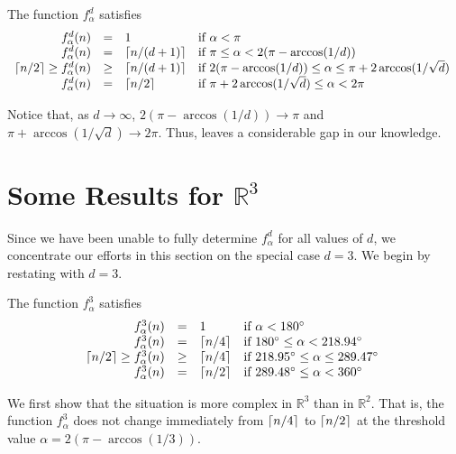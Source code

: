\documentclass[lotsofwhite]{patmorin}
\newcommand{\R}{\mathbb{R}}
\begin{document}
\begin{thm}
The function $f_\alpha^d$ satisfies
\[\begin{array}{rcll}
  f^d_\alpha(n) & = & 1 & \mbox{if $\alpha < \pi$} \\
  f^d_\alpha(n) & = & \left\lceil n/(d+1) \right\rceil & \mbox{if $\pi\le \alpha <
2(\pi-\arccos(1/d))$} \\
\left\lceil n/2 \right\rceil\ge  f^d_\alpha(n) & \ge & \left\lceil n/(d+1) \right\rceil & \mbox{if
$2(\pi-\arccos(1/d)) \le \alpha \le \pi+2\arccos(1/\sqrt{d})$ } \\
  f^d_\alpha(n) & = & \left\lceil n/2 \right\rceil & \mbox{if
$\pi+2\arccos(1/\sqrt{d})\le \alpha < 2\pi$} \\
\end{array}\]
\end{thm}

Notice that, as $d\rightarrow\infty$, $2(\pi-\arccos(1/d))\rightarrow
\pi$ and $\pi+\arccos(1/\sqrt{d})\rightarrow 2\pi$.  Thus,
 leaves a considerable gap in our knowledge.


\section{Some Results for $\R^3$}

Since we have been unable to fully determine $f^d_\alpha$ for all
values of $d$, we concentrate our efforts in this section on the
special case $d=3$.  We begin by restating  with $d=3$.

\newcommand{\degrees}{^\circ}

\begin{cor}
The function $f_\alpha^3$ satisfies
\[\begin{array}{rcll}
  f^3_\alpha(n) & = & 1 & \mbox{if $\alpha < 180\degrees$} \\
  f^3_\alpha(n) & = & \ceil{n/4} & 
    \mbox{if $180\degrees \le \alpha < 218.94\degrees$} \\
\ceil{n/2}\ge  f^3_\alpha(n) & \ge & \ceil{n/4} & 
    \mbox{if $218.95\degrees \le \alpha \le 289.47\degrees$ } \\
  f^3_\alpha(n) & = & \ceil{n/2} & 
    \mbox{if $289.48\degrees\le \alpha < 360\degrees$} \\
\end{array}\]
\end{cor}





We first show that the situation is more complex in $\R^3$
than in $\R^2$.  That is, the function $f_\alpha^3$ does not
change immediately from $\left\lceil n/4 \right\rceil$ to $\left\lceil n/2 \right\rceil$ at the threshold
value $\alpha=2(\pi-\arccos(1/3))$.
\end{document}
